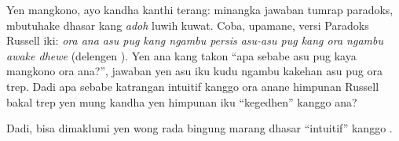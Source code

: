 \documentclass[../../../include/open-logic-section]{subfiles}
\begin{document}
Yen mangkono, ayo kandha kanthi terang:
minangka jawaban tumrap paradoks, \limofsize{}
mbutuhake dhasar kang \emph{adoh} luwih kuwat.
Coba, upamane, versi Paradoks Russell iki:
\emph{ora ana asu pug kang ngambu persis asu-asu
pug kang ora ngambu awake dhewe} (delengen
). Yen ana kang
takon ``apa sebabe asu pug kaya mangkono ora
ana?'', jawaban yen asu iku kudu ngambu kakehan
asu pug ora trep. Dadi apa sebabe katrangan
intuitif kanggo ora anane himpunan Russell
bakal trep yen mung kandha yen himpunan iku
``kegedhen'' kanggo ana?

Dadi, bisa dimaklumi yen wong rada bingung
marang dhasar ``intuitif'' kanggo \limofsize.
\end{document}
